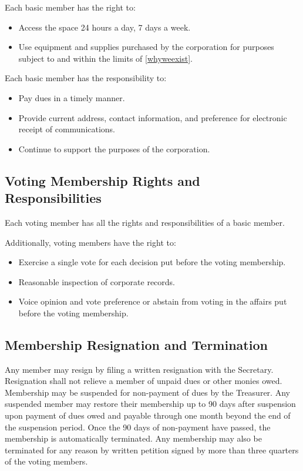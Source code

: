 \documentclass[10pt,letterpaper,titlepage]{article}
\begin{document}
Each basic member has the right to:
\begin{itemize}
    \item Access the space 24 hours a day, 7 days a week.

    \item Use equipment and supplies purchased by the corporation for purposes
        subject to and within the limits of \ref{whyweexist}.
\end{itemize}

Each basic member has the responsibility to:
\begin{itemize}
    \item Pay dues in a timely manner.

    \item Provide current address, contact information, and preference for
        electronic receipt of communications.

    \item Continue to support the purposes of the corporation.
\end{itemize}

\subsection{Voting Membership Rights and Responsibilities}
Each voting member has all the rights and responsibilities of a basic member.

Additionally, voting members have the right to:
\begin{itemize}
    \item Exercise a single vote for each decision put before the voting
        membership.

    \item Reasonable inspection of corporate records.

    \item Voice opinion and vote preference or abstain from voting in the
        affairs put before the voting membership.
\end{itemize}

\subsection{Membership Resignation and Termination}
Any member may resign by filing a written resignation with the
Secretary.
Resignation shall not relieve a member of unpaid dues or other monies
owed.
Membership may be suspended for non-payment of dues by the Treasurer.
Any suspended member may restore their membership up to 90 days after
suspension upon payment of dues owed and payable through one month beyond the
end of the suspension period.
Once the 90 days of non-payment have passed, the membership is automatically
terminated.
Any membership may also be terminated for any reason by written petition
signed by more than three quarters of the voting members.
\end{document}
